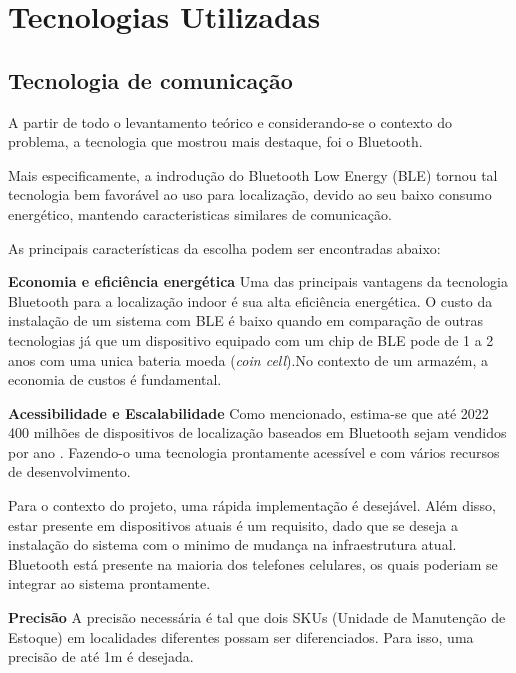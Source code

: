 \chapter{Tecnologias Utilizadas}

\section{Tecnologia de comunicação}
A partir de todo o levantamento teórico e considerando-se o contexto do problema, a tecnologia que mostrou mais destaque, foi o Bluetooth. 

Mais especificamente, a indrodução do Bluetooth Low Energy (BLE) tornou tal tecnologia bem favorável ao uso para localização, devido ao seu baixo consumo energético, mantendo caracteristicas similares de comunicação.

As principais características da escolha podem ser encontradas abaixo:\newline

\textbf{Economia e eficiência energética} \newline
Uma das principais vantagens da tecnologia Bluetooth para a localização indoor é sua alta eficiência energética. O custo da instalação de um sistema com BLE é baixo quando em comparação de outras tecnologias já que um dispositivo equipado com um chip de BLE pode de 1 a 2 anos com uma unica bateria moeda (\textit{coin cell}).No contexto de um armazém, a economia de custos é fundamental. \newline

\textbf{Acessibilidade e Escalabilidade} \newline
Como mencionado, estima-se que até 2022 400 milhões de dispositivos de localização baseados em Bluetooth sejam vendidos por ano \cite{art9}. Fazendo-o uma tecnologia prontamente acessível e com vários recursos de desenvolvimento.

Para o contexto do projeto, uma rápida implementação é desejável. Além disso, estar presente em dispositivos atuais é um requisito, dado que se deseja a instalação do sistema com o minimo de mudança na infraestrutura atual. Bluetooth está presente na maioria dos telefones celulares, os quais poderiam se integrar ao sistema prontamente. \newline

\textbf{Precisão}\newline
A precisão necessária é tal que dois SKUs (Unidade de Manutenção de Estoque) em localidades diferentes possam ser diferenciados. Para isso, uma precisão de até 1m é desejada.


